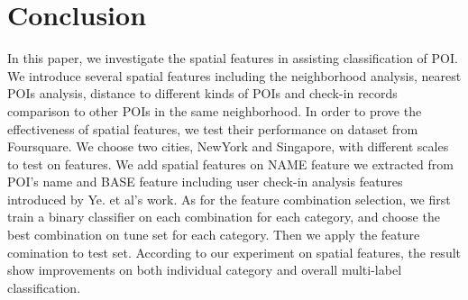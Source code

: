 \section{Conclusion}
In this paper, we investigate the spatial features in assisting classification of POI. We introduce several spatial features including the neighborhood analysis, nearest POIs analysis, distance to different kinds of POIs and check-in records comparison to other POIs in the same neighborhood. In order to prove the effectiveness of spatial features, we test their performance on dataset from Foursquare. We choose two cities, NewYork and Singapore, with different scales to test on features. We add spatial features on NAME feature we extracted from POI's name and BASE feature including user check-in analysis features introduced by Ye. et al's work. As for the feature combination selection, we first train a binary classifier on each combination for each category, and choose the best combination on tune set for each category. Then we apply the feature comination to test set. According to our experiment on spatial features, the result show improvements on both individual category and overall multi-label classification. 